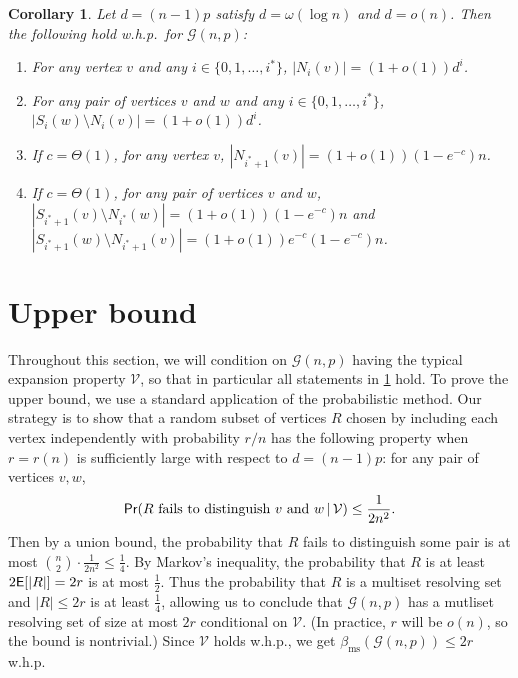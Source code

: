 \documentclass[12pt]{article}
\newtheorem{corollary}[theorem]{Corollary}
\theoremstyle{definition}
\theoremstyle{remark}
\theoremstyle{remark}
\numberwithin{theorem}{section}
\newcommand{\E}{\textsf{\upshape E}}
\newcommand{\prob}{\textsf{\upshape Pr}}
\newcommand{\Gnp}{\mathcal{G}(n,p)}
\begin{document}
\begin{corollary}\label{cor:expansion_cor}
Let $d = (n-1)p$ satisfy $d = \omega(\log n)$ and $d = o(n)$. Then the following hold w.h.p.\ for $\Gnp$: 
	\begin{enumerate}[label = (\roman*)]
		\item For any vertex $v$ and any $i \in \{ 0,1,\dots,i^{*} \} $, $|N_{i}(v)| = (1+o(1))d^{i}$.
		\item For any pair of vertices $v$ and $w$ and any $i  \in \{ 0,1,\dots,i^{*} \} $, $|S_{i}(w) \setminus N_{i}(v)| = (1+o(1))d^{i}$.
		\item If $c = \Theta(1)$, for any vertex $v$, $|N_{i^{*}+1}(v)| = (1+o(1))(1-e^{-c})n$.
		\item If $c = \Theta(1)$, for any pair of vertices $v$ and $w$, $|S_{i^{*}+1}(v) \setminus N_{i^{*}}(w)| = (1+o(1))(1-e^{-c})n$ and $|S_{i^{*}+1}(w) \setminus N_{i^{*}+1}(v)| = (1+o(1))e^{-c}(1-e^{-c})n$.
	\end{enumerate}
\end{corollary}

\section{Upper bound}\label{sec:upper_bound}
Throughout this section, we will condition on $\Gnp$ having the typical expansion property $\mathcal{V}$, so that in particular all statements in \cref{cor:expansion_cor} hold. To prove the upper bound, we use a standard application of the probabilistic method. Our strategy is to show that a random subset of vertices $R$ chosen by including each vertex independently with probability $r/n$ has the following property when $r = r(n)$ is sufficiently large with respect to $d = (n-1)p$: for any pair of vertices $v,w$, 
\begin{equation}\label{eq:distinguish_prob}
	\prob(R\text{ fails to distinguish }v\text{ and }w\,|\,\mathcal{V}) \leq \frac{1}{2n^{2}}.
\end{equation}
Then by a union bound, the probability that $R$ fails to distinguish some pair is at most $\binom{n}{2}\cdot\frac{1}{2n^{2}} \leq \frac{1}{4}$. By Markov's inequality, the probability that $R$ is at least $2\E[|R|] = 2r$ is at most $\frac{1}{2}$. Thus the probability that $R$ is a multiset resolving set and $|R| \leq 2r$ is at least $\frac{1}{4}$, allowing us to conclude that $\Gnp$ has a mutliset resolving set of size at most $2r$ conditional on $\mathcal{V}$. (In practice, $r$ will be $o(n)$, so the bound is nontrivial.) Since $\mathcal{V}$ holds w.h.p., we get $\beta_{\text{ms}}(\Gnp) \leq 2r$ w.h.p.
\end{document}
